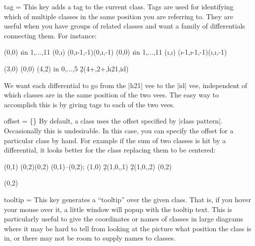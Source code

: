 \begin{sseqdata}[|| name = ex1, cohomological Serre grading]
\begin{key}{tag = }
This key adds a tag to the current class. Tags are used for identifying which of multiple classes in the same position you are referring to. They are useful when you have groups of related classes and want a family of differentials connecting them.  For instance:
\begin{codeexample}[width = 8cm]
\DeclareSseqGroup\tower {} {
    \class(0,0)
    \foreach \i in {1,...,11} {
        \class(0,\i)
        \structline(0,\i-1,-1)(0,\i,-1)
    }
}
\NewSseqGroup\hvee {} {
    \tower(0,0)
    \foreach \i in {1,...,11} {
        \class(\i,\i)
        \structline(\i-1,\i-1,-1)(\i,\i,-1)
    }
}
\begin{sseqpage}[ degree = {-1}{1}, yscale = 1.1,
                  x range = {0}{5}, y range = {0}{5} ]
\tower(3,0)
\hvee[tag = id](0,0)
\hvee[tag = h21](4,2)
\foreach \n in {0,...,5} {
    \d2(4+\n,2+\n,h21,id)
}
\end{sseqpage}
\end{codeexample}
We want each differential to go from the |h21| vee to the |id| vee, independent of which classes are in the same position of the two vees. The easy way to accomplish this is by giving tags to each of the two vees.
\end{key}

\begin{key}{offset = \{\}}
By default, a class uses the offset specified by |class pattern|. Occasionally this is undesirable. In this case, you can specify the offset for a particular class by hand. For example if the sum of two classes is hit by a differential, it looks better for the class replacing them to be centered:
\begin{codeexample}[width = 9cm]
\begin{sseqdata}[ name = offset example,
    xscale = 0.7,
    Adams grading,
    class placement transform = {scale = 1.8} ]
\class(0,1)
\class(0,2)\class(0,2)
\draw(0,1)--(0,2);
\class(1,0)
\d2(1,0,,1)
\d2(1,0,,2)
\replaceclass(0,2)
\end{sseqdata}
\printpage[name = offset example, page=2]
\printpage[name = offset example, page=3]
\begin{sseqpage}[name = offset example, page=3]
\classoptions[offset = {(0,0)}](0,2)
\end{sseqpage}
\end{codeexample}
\end{key}

\begin{key}{tooltip = }
This key generates a ``tooltip'' over the given class. That is, if you hover your mouse over it, a little window will popup with the tooltip text. This is particularly useful to give the coordinates or names of classes in large diagrams where it may be hard to tell from looking at the picture what position the class is in, or there may not be room to supply names to classes.


\end{key}
\end{sseqdata}
